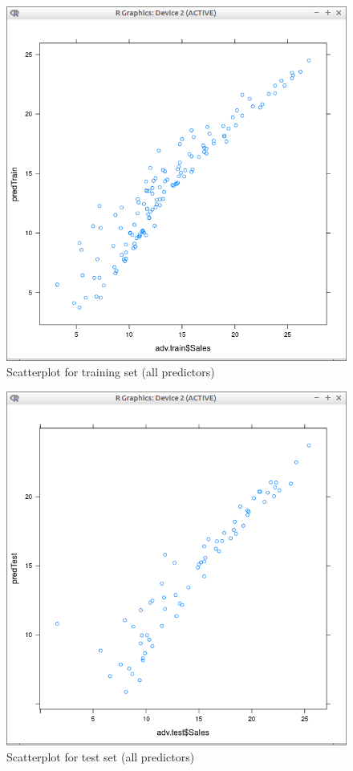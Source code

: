 \documentclass[10pt,a4paper]{article}
\begin{document}
\begin{figure}[H]
\centering
\includegraphics[width=140mm]{figures/pltOrdTrain.png}
\caption{Scatterplot for training set (all predictors) \label{overflow}}
\end{figure}

\begin{figure}[H]
\centering
\includegraphics[width=140mm]{figures/pltOrdTest.png}
\caption{Scatterplot for test set (all predictors) \label{overflow}}
\end{figure}
\vspace{5cm}
\end{document}
